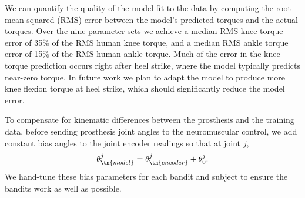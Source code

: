 We can quantify the quality of the model fit to the data by computing the root
mean squared (RMS) error between the model's predicted torques and the actual
torques. Over the nine parameter sets we achieve a median RMS knee torque error
of 35\% of the RMS human knee torque, and a median RMS ankle torque error of
15\% of the RMS human ankle torque. Much of the error in the knee torque
prediction occurs right after heel strike, where the model typically predicts
near-zero torque. In future work we plan to adapt the model to produce more knee
flexion torque at heel strike, which should significantly reduce the model
error.

To compensate for kinematic differences between the prosthesis and the training
data, before sending prosthesis joint angles to the neuromuscular control, we
add constant bias angles to the joint encoder readings so that at joint $j$,
\begin{align}
    \theta_\tn{model}^j = \theta_\tn{encoder}^j + \theta_0^j.
    \label{eq:bias_param}
\end{align}
We hand-tune these bias parameters for each bandit and subject to ensure the
bandits work as well as possible.
 
